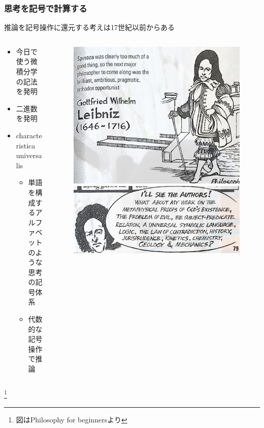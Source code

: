 \documentclass[unicode, 14pt, aspectratio=169]{beamer}
\newcommand\blfootnote[1]{%
  \begingroup
  \renewcommand\thefootnote{}\footnote{#1}%
  \addtocounter{footnote}{-1}%
  \endgroup
}
\begin{document}
\begin{frame}
  \frametitle{思考を記号で計算する}
  {\large 推論を記号操作に還元する考えは17世紀以前からある}
  \begin{columns}
    \begin{column}{0.6\textwidth}
      \begin{itemize}
        \item 今日で使う微積分学の記法を発明        
        \item 二進数を発明
        \item characteristica universalis
          \begin{itemize}
          \item 単語を構成するアルファベットのような思考の記号体系
          \item 代数的な記号操作で推論
          \end{itemize}
      \end{itemize}
    \end{column}    
    \begin{column}{0.4\textwidth}
      \begin{figure}
        \includegraphics[width=0.7\linewidth]{images/leibniz.png}
        \includegraphics[width=0.7\linewidth]{images/universal.png}
      \end{figure}       
    \end{column} 
  \end{columns}
  \blfootnote{図はPhilosophy for beginners\supercite{philosophy-for-begginers}より}  
\end{frame}
\end{document}
